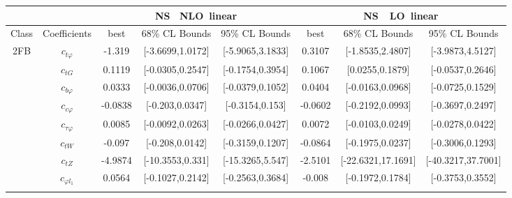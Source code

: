 \documentclass{article}
\begin{document}
\begin{table}[H]
\centering
\begin{tabular}{|c|c|c|c|c|c|c|c|}
\hline
 &  & \multicolumn{3}{c|}{\rm NS \ NLO\ linear} & \multicolumn{3}{c|}{\rm NS\ \ LO\ linear} \\ \hline
Class & Coefficients & best & 68\% CL Bounds & 95\% CL Bounds & best & 68\% CL Bounds & 95\% CL Bounds\\ \hline
\multirow{23}{*}{2FB}
 & $c_{t \varphi}$ & -1.319                             & [-3.6699,1.0172]                                 & [-5.9065,3.1833] & 0.3107                             & [-1.8535,2.4807]                                 & [-3.9873,4.5127] \\ \cline{2-8}
 & $c_{tG}$ & 0.1119                             & [-0.0305,0.2547]                                 & [-0.1754,0.3954] & 0.1067                             & [0.0255,0.1879]                                 & [-0.0537,0.2646] \\ \cline{2-8}
 & $c_{b \varphi}$ & 0.0333                             & [-0.0036,0.0706]                                 & [-0.0379,0.1052] & 0.0404                             & [-0.0163,0.0968]                                 & [-0.0725,0.1529] \\ \cline{2-8}
 & $c_{c \varphi}$ & -0.0838                             & [-0.203,0.0347]                                 & [-0.3154,0.153] & -0.0602                             & [-0.2192,0.0993]                                 & [-0.3697,0.2497] \\ \cline{2-8}
 & $c_{\tau \varphi}$ & 0.0085                             & [-0.0092,0.0263]                                 & [-0.0266,0.0427] & 0.0072                             & [-0.0103,0.0249]                                 & [-0.0278,0.0422] \\ \cline{2-8}
 & $c_{tW}$ & -0.097                             & [-0.208,0.0142]                                 & [-0.3159,0.1207] & -0.0864                             & [-0.1975,0.0237]                                 & [-0.3006,0.1293] \\ \cline{2-8}
 & $c_{tZ}$ & -4.9874                             & [-10.3553,0.331]                                 & [-15.3265,5.547] & -2.5101                             & [-22.6321,17.1691]                                 & [-40.3217,37.7001] \\ \cline{2-8}
 & $c_{\varphi l_1}$ & 0.0564                             & [-0.1027,0.2142]                                 & [-0.2563,0.3684] & -0.008                             & [-0.1972,0.1784]                                 & [-0.3753,0.3552] \\ \cline{2-8}

\end{tabular}
\end{table}
\end{document}
